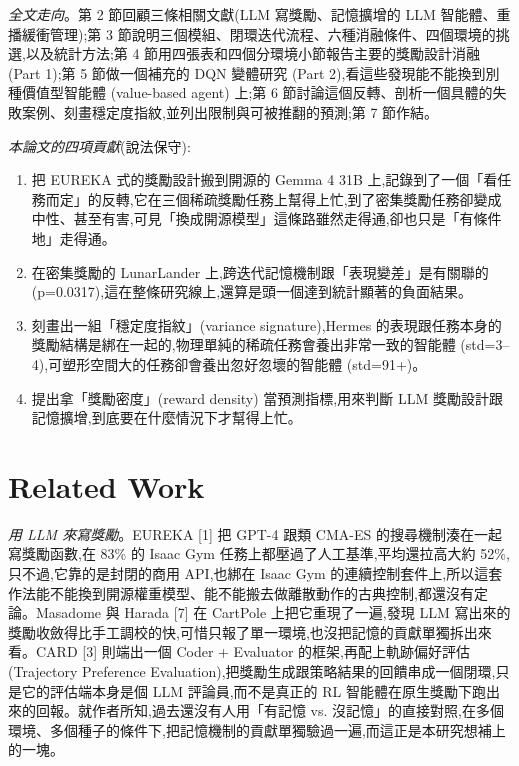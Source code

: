 \documentclass[conference,onecolumn,letterpaper,10pt]{IEEEtran}
\providecommand{\tightlist}{\setlength{\itemsep}{0pt}\setlength{\parskip}{0pt}}
\begin{document}
\emph{全文走向}。第 2 節回顧三條相關文獻(LLM 寫獎勵、記憶擴增的 LLM 智能體、重播緩衝管理);第 3 節說明三個模組、閉環迭代流程、六種消融條件、四個環境的挑選,以及統計方法;第 4 節用四張表和四個分環境小節報告主要的獎勵設計消融 (Part 1);第 5 節做一個補充的 DQN 變體研究 (Part 2),看這些發現能不能換到別種價值型智能體 (value-based agent) 上;第 6 節討論這個反轉、剖析一個具體的失敗案例、刻畫穩定度指紋,並列出限制與可被推翻的預測;第 7 節作結。

\emph{本論文的四項貢獻}(說法保守):

\begin{enumerate}
\def\labelenumi{\arabic{enumi}.}
\tightlist
\item
  把 EUREKA 式的獎勵設計搬到開源的 Gemma 4 31B 上,記錄到了一個「看任務而定」的反轉,它在三個稀疏獎勵任務上幫得上忙,到了密集獎勵任務卻變成中性、甚至有害,可見「換成開源模型」這條路雖然走得通,卻也只是「有條件地」走得通。
\item
  在密集獎勵的 LunarLander 上,跨迭代記憶機制跟「表現變差」是有關聯的 (p=0.0317),這在整條研究線上,還算是頭一個達到統計顯著的負面結果。
\item
  刻畫出一組「穩定度指紋」(variance signature),Hermes 的表現跟任務本身的獎勵結構是綁在一起的,物理單純的稀疏任務會養出非常一致的智能體 (std=3--4),可塑形空間大的任務卻會養出忽好忽壞的智能體 (std=91+)。
\item
  提出拿「獎勵密度」(reward density) 當預測指標,用來判斷 LLM 獎勵設計跟記憶擴增,到底要在什麼情況下才幫得上忙。
\end{enumerate}


\section{Related Work}

\emph{用 LLM 來寫獎勵}。EUREKA {[}1{]} 把 GPT-4 跟類 CMA-ES 的搜尋機制湊在一起寫獎勵函數,在 83\% 的 Isaac Gym 任務上都壓過了人工基準,平均還拉高大約 52\%,只不過,它靠的是封閉的商用 API,也綁在 Isaac Gym 的連續控制套件上,所以這套作法能不能換到開源權重模型、能不能搬去做離散動作的古典控制,都還沒有定論。Masadome 與 Harada {[}7{]} 在 CartPole 上把它重現了一遍,發現 LLM 寫出來的獎勵收斂得比手工調校的快,可惜只報了單一環境,也沒把記憶的貢獻單獨拆出來看。CARD {[}3{]} 則端出一個 Coder + Evaluator 的框架,再配上軌跡偏好評估 (Trajectory Preference Evaluation),把獎勵生成跟策略結果的回饋串成一個閉環,只是它的評估端本身是個 LLM 評論員,而不是真正的 RL 智能體在原生獎勵下跑出來的回報。就作者所知,過去還沒有人用「有記憶 vs. 沒記憶」的直接對照,在多個環境、多個種子的條件下,把記憶機制的貢獻單獨驗過一遍,而這正是本研究想補上的一塊。
\end{document}
